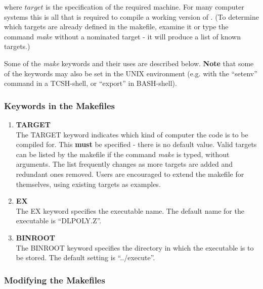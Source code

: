 \noindent where $target$ is the specification of the required
machine.  For many computer systems this is all that is required
to compile a working version of \D. (To determine which targets
are already defined in the makefile, examine it or type the
command {\sl make} without a nominated target - it will produce a
list of known targets.)

Some of the {\sl make} keywords and their uses are described below.
{\bf Note} that some of the keywords may also be set in the UNIX
environment (e.g. with the ``setenv'' command in a TCSH-shell, or
``export'' in BASH-shell).

\subsubsection*{Keywords in the Makefiles}

\begin{enumerate}
\item {\bf TARGET} \\
The TARGET keyword indicates which kind of computer the code is to
be compiled for.  This {\bf must} be specified - there is no default
value.  Valid targets can be listed by the makefile if the command
{\sl make} is typed, without arguments.  The list frequently changes
as more targets are added and redundant ones removed.  Users are
encouraged to extend the makefile for themselves, using existing
targets as examples. \\

\item {\bf EX} \\
The EX keyword specifies the executable name.  The default name for
the executable is ``DLPOLY.Z''. \\

\item {\bf BINROOT} \\
The BINROOT keyword specifies the directory in which the executable is
to be stored.  The default setting is ``../execute''.
\end{enumerate}

\subsubsection*{Modifying the Makefiles}

